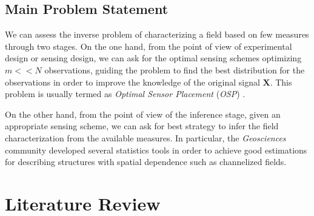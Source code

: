 

\subsection{Main Problem Statement}

We can assess the inverse problem of characterizing a field based on few measures through two stages. On the one hand, from the point of view of experimental design or sensing design, we can ask for the optimal sensing schemes optimizing $m << N$ observations, guiding the problem to find the best distribution for the observations in order to improve the knowledge of the original signal $\mathbf{X}$. This problem is usually termed as \emph{Optimal Sensor Placement} (\emph{OSP}) \cite{olea_84_a,krause08thesis,krause11robust}. 

On the other hand, from the point of view of the inference stage, given an appropriate sensing scheme, we can ask for best strategy to infer the field characterization from the available measures. In particular, the \emph{Geosciences} community developed several statistics tools in order to achieve good estimations for describing structures with spatial dependence such as channelized fields.











































\section{Literature Review}

